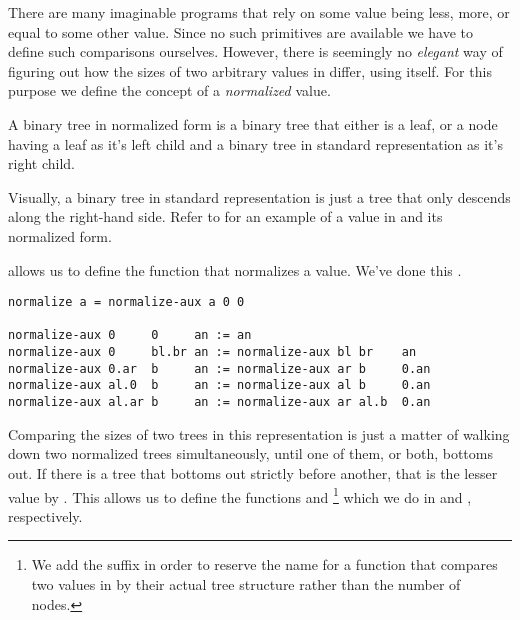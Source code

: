 There are many imaginable programs that rely on some value being less, more, or
equal to some other value. Since no such primitives are available we have to
define such comparisons ourselves. However, there is seemingly no
\emph{elegant} way of figuring out how the sizes of two arbitrary values in
\D{} differ, using \D{} itself. For this purpose we define the concept of a
\emph{normalized} value.

\begin{definition}\label{definition:normal-form} A binary tree in normalized
form is a binary tree that either is a leaf, or a node having a leaf as it's
left child and a binary tree in standard representation as it's right
child.\end{definition}

Visually, a binary tree in standard representation is just a tree that only
descends along the right-hand side. Refer to 
for an example of a value in \D{} and its normalized form.


 allows us to define the function
 that normalizes a value. We've done this
.

\begin{lstlisting}[label=listing:normalize,
  caption={The function \mono{normalize/1} turns any value $b\in\mathbb{B}$ into its normal form.}]
normalize a = normalize-aux a 0 0

normalize-aux 0     0     an := an
normalize-aux 0     bl.br an := normalize-aux bl br    an
normalize-aux 0.ar  b     an := normalize-aux ar b     0.an
normalize-aux al.0  b     an := normalize-aux al b     0.an
normalize-aux al.ar b     an := normalize-aux ar al.b  0.an
\end{lstlisting}

Comparing the sizes of two trees in this representation is just a matter of
walking down two normalized trees simultaneously, until one of them, or both,
bottoms out. If there is a tree that bottoms out strictly before another, that
is the lesser value by . This allows us to define the
functions  and \footnote{We add the
 suffix in order to reserve the name  for a function
that compares two values in \D{} by their actual tree structure rather than the
number of nodes.} which we do in  and
, respectively.

